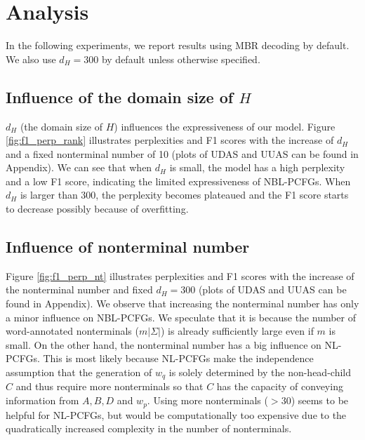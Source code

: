 \documentclass[11pt,a4paper]{article}
\begin{document}
\section{Analysis}
  In the following experiments, we report results using MBR decoding by default. We also use $d_H=300$ by default unless otherwise specified.

\subsection{Influence of the domain size of $H$}
\label{sec:inf_h}
$d_H$ (the domain size of $H$) influences the expressiveness of our model. Figure \ref{fig:f1_perp_rank} illustrates perplexities and F1 scores with the increase of $d_H$ and a fixed nonterminal number of 10 (plots of UDAS and UUAS can be found in Appendix).  We can see that when $d_H$ is small, the model has a high perplexity and a low F1 score, indicating the limited expressiveness of NBL-PCFGs. When $d_H$ is larger than 300, the perplexity becomes plateaued and the F1 score starts to decrease possibly because of overfitting.


\subsection{Influence of nonterminal number}
\label{sec:inf_nt}
Figure \ref{fig:f1_perp_nt} illustrates perplexities and F1 scores with the increase of the nonterminal number and fixed $d_{H}=300$ (plots of UDAS and UUAS can be found in Appendix). We observe that increasing the nonterminal number has only a minor influence on NBL-PCFGs. We speculate that it is because the number of word-annotated nonterminals ($m|\Sigma|$) is already sufficiently large even if $m$ is small. On the other hand, the nonterminal number has a big influence on NL-PCFGs. This is most likely because NL-PCFGs make the independence assumption that the generation of $w_q$ is solely determined by the non-head-child $C$ and thus require more nonterminals so that $C$ has the capacity of conveying information from $A,B,D$ and $w_p$.
Using more nonterminals ($>30$) seems to be helpful for NL-PCFGs, but would be computationally too expensive due to the quadratically increased complexity in the number of nonterminals.

 
\end{document}
